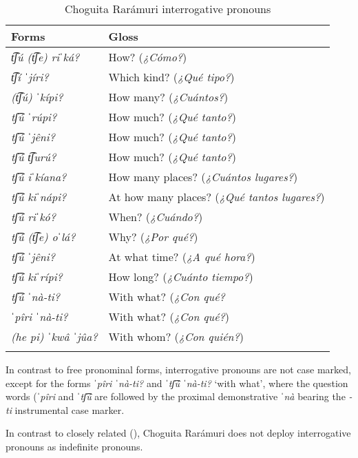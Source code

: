 
\begin{table}
\caption{Choguita Rarámuri interrogative pronouns}
\label{tab:interrogative-pronouns-2}

\begin{tabularx}{.9\textwidth}{ll}
\lsptoprule
\textbf{Forms}  & \textbf{Gloss} \\
\midrule
\textit{t͡ʃú (t͡ʃe) riˈká?} & How? (\textit{¿Cómo?})\\
\textit{t͡ʃí ˈjíri?} & Which kind? (\textit{¿Qué tipo?})\\
\textit{(t͡ʃú) ˈkípi?} & How many? (\textit{¿Cuántos?})\\
\textit{tʃ͡ú ˈrúpi?} & How much? (\textit{¿Qué tanto?})\\
\textit{tʃ͡ú ˈjêni?} & How much? (\textit{¿Qué tanto?})\\
\textit{tʃ͡ú t͡ʃurú?} & How much? (\textit{¿Qué tanto?})\\
\textit{tʃ͡ú iˈkíana?} & How many places? (\textit{¿Cuántos lugares?})\\
\textit{tʃ͡ú kiˈnápi?} & At how many places? (\textit{¿Qué tantos lugares?})\\
\textit{tʃ͡ú riˈkó?}  & When? (\textit{¿Cuándo?})\\
\textit{tʃ͡ú (t͡ʃe) oˈlá?} & Why? (\textit{¿Por qué?})\\
\textit{tʃ͡ú ˈjêni?} & At what time? (\textit{¿A qué hora?})\\
\textit{tʃ͡ú kiˈrípi?} & How long? (\textit{¿Cuánto tiempo?})\\
\textit{tʃ͡ú ˈnà-ti?} & With what? (\textit{¿Con qué?}\\
\textit{ˈpîri ˈnà-ti?} & With what? (\textit{¿Con qué?})\\
\textit{(he pi) ˈkwâ ˈjûa?} & With whom? (\textit{¿Con quién?})\\
\lspbottomrule
\end{tabularx}
\end{table}

In contrast to free pronominal forms, interrogative pronouns are not case marked, except for the forms \textit{ˈpîri ˈnà-ti?} and \textit{ˈtʃ͡ú ˈnà-ti?} `with what', where the question words (\textit{ˈpîri} and \textit{ˈtʃ͡ú} are followed by the proximal demonstrative \textit{ˈnà} bearing the \textit{-ti} instrumental case marker.

In contrast to closely related  (\citealt{miller1996guarijio}), Choguita Rarámuri does not deploy interrogative pronouns as indefinite pronouns.


